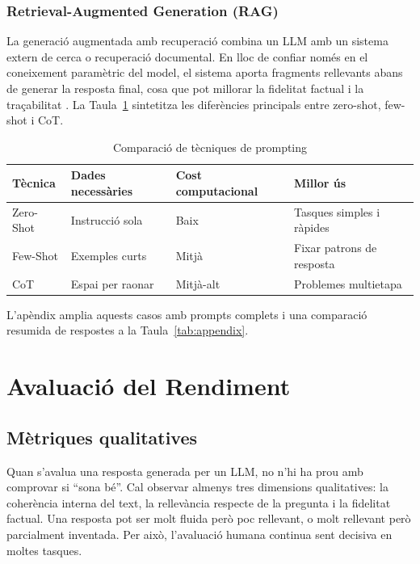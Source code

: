 \documentclass[12pt,a4paper]{report}
\newcommand{\source}[1]{\par\vspace{0.15em}{\small\textit{Font: #1.}}}
\begin{document}
\subsection{Retrieval-Augmented Generation (RAG)}
La generació augmentada amb recuperació combina un LLM amb un sistema extern de cerca o recuperació documental. En lloc de confiar només en el coneixement paramètric del model, el sistema aporta fragments rellevants abans de generar la resposta final, cosa que pot millorar la fidelitat factual i la traçabilitat \cite{lewis2020}. La Taula~\ref{tab:comparacio} sintetitza les diferències principals entre zero-shot, few-shot i CoT.

\begin{table}[H]
  \centering
  \caption{Comparació de tècniques de prompting}
  \label{tab:comparacio}
  \source{Compilada per l'Autor}
  \begin{tabular}{llll}
    \toprule
    Tècnica & Dades necessàries & Cost computacional & Millor ús \\
    \midrule
    Zero-Shot & Instrucció sola & Baix & Tasques simples i ràpides \\
    Few-Shot & Exemples curts & Mitjà & Fixar patrons de resposta \\
    CoT & Espai per raonar & Mitjà-alt & Problemes multietapa \\
    \bottomrule
  \end{tabular}
\end{table}

L'apèndix amplia aquests casos amb prompts complets i una comparació resumida de respostes a la Taula~\ref{tab:appendix}.

\chapter{Avaluació del Rendiment}

\section{Mètriques qualitatives}
Quan s'avalua una resposta generada per un LLM, no n'hi ha prou amb comprovar si ``sona bé''. Cal observar almenys tres dimensions qualitatives: la coherència interna del text, la rellevància respecte de la pregunta i la fidelitat factual. Una resposta pot ser molt fluida però poc rellevant, o molt rellevant però parcialment inventada. Per això, l'avaluació humana continua sent decisiva en moltes tasques.
\end{document}
